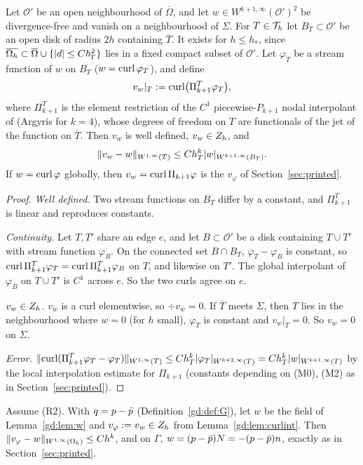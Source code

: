 \begin{lemma}\label{gd:lem:curlint}
Let $\mathcal O'$ be an open neighbourhood of $\overline\Omega$, and let $w\in W^{k+1,\infty}(\mathcal O')^2$ be divergence-free and vanish on a neighbourhood of $\Sigma$. For $T\in\mathcal T_h$ let $B_T\subset\mathcal O'$ be an open disk of radius $2h$ containing $\overline T$. It exists for $h\le h_\ast$, since $\overline{\Omega_h}\subset\overline\Omega\cup\{|d|\le Ch_\Gamma^2\}$ lies in a fixed compact subset of $\mathcal O'$. Let $\varphi_T$ be a stream function of $w$ on $B_T$ ($w=\operatorname{curl}\varphi_T$), and define
\[
v_w|_T:=\operatorname{curl}\bigl(\Pi_{k+1}^T\varphi_T\bigr),
\]
where $\Pi^T_{k+1}$ is the element restriction of the $C^1$ piecewise-$P_{k+1}$ nodal interpolant of \cite{MorganScott1975} (Argyris for $k=4$), whose degrees of freedom on $T$ are functionals of the jet of the function on $\overline T$. Then $v_w$ is well defined, $v_w\in Z_h$, and
\[
\lVert v_w-w\rVert_{W^{1,\infty}(T)}\le Ch_T^k|w|_{W^{k+1,\infty}(B_T)}.
\]
If $w=\operatorname{curl}\varphi$ globally, then $v_w=\operatorname{curl}\Pi_{k+1}\varphi$ is the $v_\varphi$ of Section~\ref{sec:printed}.
\end{lemma}

\begin{proof}
\emph{Well defined.} Two stream functions on $B_T$ differ by a constant, and $\Pi^T_{k+1}$ is linear and reproduces constants.

\emph{Continuity.} Let $T,T'$ share an edge $e$, and let $B\subset\mathcal O'$ be a disk containing $T\cup T'$ with stream function $\varphi_B$. On the connected set $B\cap B_T$, $\varphi_T-\varphi_B$ is constant, so $\operatorname{curl}\Pi^T_{k+1}\varphi_T=\operatorname{curl}\Pi^T_{k+1}\varphi_B$ on $T$, and likewise on $T'$. The global interpolant of $\varphi_B$ on $T\cup T'$ is $C^1$ across $e$. So the two curls agree on $e$.

\emph{$v_w\in Z_h$.} $v_w$ is a curl elementwise, so $\div v_w=0$. If $\overline T$ meets $\Sigma$, then $T$ lies in the neighbourhood where $w=0$ (for $h$ small), $\varphi_T$ is constant and $v_w|_T=0$. So $v_w=0$ on $\Sigma$.

\emph{Error.} $\lVert \operatorname{curl}(\Pi^T_{k+1}\varphi_T-\varphi_T)\rVert_{W^{1,\infty}(T)}\le Ch_T^k|\varphi_T|_{W^{k+2,\infty}(T)}=Ch_T^k|w|_{W^{k+1,\infty}(T)}$ by the local interpolation estimate for $\Pi_{k+1}$ (constants depending on (M0), (M2) as in Section~\ref{sec:printed}).
\end{proof}

\begin{definition}\label{gd:def:vphi}
Assume (R2). With $q=p-\bar p$ (Definition~\ref{gd:def:G}), let $w$ be the field of Lemma~\ref{gd:lem:w} and $v_\varphi:=v_w\in Z_h$ from Lemma~\ref{gd:lem:curlint}. Then $\lVert v_\varphi-w\rVert_{W^{1,\infty}(\Omega_h)}\le Ch^k$, and on $\Gamma$, $w=(p-\bar p)N=-(p-\bar p)n$, exactly as in Section~\ref{sec:printed}.
\end{definition}


